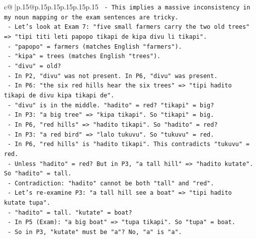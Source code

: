 \documentclass{article}
\begin{document}
{\begin{supertabular}{c@{$\;$}|p{.15\linewidth}@{}p{.15\linewidth}p{.15\linewidth}p{.15\linewidth}p{.15\linewidth}p{.15\linewidth}}
{{{\texttt{                        {-} This implies a massive inconsistency in my noun mapping or the exam sentences are tricky.} \\
\texttt{                        {-} Let's look at Exam 7: "five small farmers carry the two old trees" => "tipi titi leti papopo tikapi de kipa divu li tikapi".} \\
\texttt{                          {-} "papopo" = farmers (matches English "farmers").} \\
\texttt{                          {-} "kipa" = trees (matches English "trees").} \\
\texttt{                          {-} "divu" = old?} \\
\texttt{                          {-} In P2, "divu" was not present. In P6, "divu" was present.} \\
\texttt{                          {-} In P6: "the six red hills hear the six trees" => "tipi hadito tikapi de divu kipa tikapi de".} \\
\texttt{                            {-} "divu" is in the middle. "hadito" = red? "tikapi" = big?} \\
\texttt{                            {-} In P3: "a big tree" => "kipa tikapi". So "tikapi" = big.} \\
\texttt{                            {-} In P6, "red hills" => "hadito tikapi". So "hadito" = red?} \\
\texttt{                            {-} In P3: "a red bird" => "lalo tukuvu". So "tukuvu" = red.} \\
\texttt{                            {-} In P6, "red hills" is "hadito tikapi". This contradicts "tukuvu" = red.} \\
\texttt{                            {-} Unless "hadito" = red? But in P3, "a tall hill" => "hadito kutate". So "hadito" = tall.} \\
\texttt{                            {-} Contradiction: "hadito" cannot be both "tall" and "red".} \\
\texttt{                            {-} Let's re{-}examine P3: "a tall hill see a boat" => "tipi hadito kutate tupa".} \\
\texttt{                              {-} "hadito" = tall. "kutate" = boat?} \\
\texttt{                              {-} In P5 (Exam): "a big boat" => "tupa tikapi". So "tupa" = boat.} \\
\texttt{                              {-} So in P3, "kutate" must be "a"? No, "a" is "a".} \\
}}}
\end{supertabular}}
\end{document}
